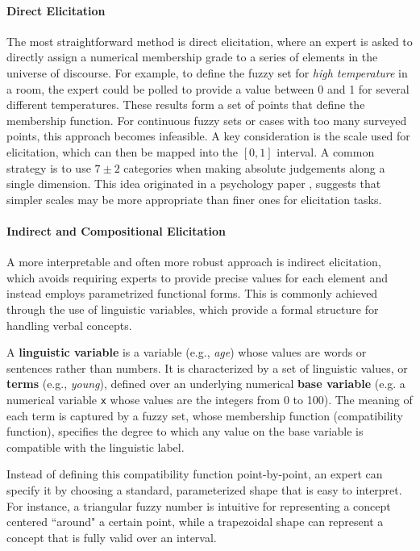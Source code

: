 \paragraph{Direct Elicitation}
The most straightforward method is direct elicitation, where an expert is asked to directly assign a numerical membership grade to a series of elements in the universe of discourse. For example, to define the fuzzy set for \emph{high temperature} in a room, the expert could be polled to provide a value between 0 and 1 for several different temperatures. These results form a set of points that define the membership function. For continuous fuzzy sets or cases with too many surveyed points, this approach becomes infeasible. A key consideration is the scale used for elicitation, which can then be mapped into the $[0,1]$ interval. A common strategy is to use $7\pm2$ categories when making absolute judgements along a single dimension. This idea originated in a psychology paper \cite{miller1956magical}, suggests that simpler scales may be more appropriate than finer ones for elicitation tasks.

\paragraph{Indirect and Compositional Elicitation}
A more interpretable and often more robust approach is indirect elicitation, which avoids requiring experts to provide precise values for each element and instead employs parametrized functional forms. This is commonly achieved through the use of linguistic variables, which provide a formal structure for handling verbal concepts.

\begin{definition}
A \textbf{linguistic variable} is a variable (e.g., \emph{age}) whose values are words or sentences rather than numbers. It is characterized by a set of linguistic values, or \textbf{terms} (e.g., \emph{young}), defined over an underlying numerical \textbf{base variable} (e.g. a numerical variable \texttt{x} whose values are the integers from 0 to 100). The meaning of each term is captured by a fuzzy set, whose membership function (compatibility function), specifies the degree to which any value on the base variable is compatible with the linguistic label.
\end{definition}

Instead of defining this compatibility function point-by-point, an expert can specify it by choosing a standard, parameterized shape that is easy to interpret. For instance, a triangular fuzzy number is intuitive for representing a concept centered ``around" a certain point, while a trapezoidal shape can represent a concept that is fully valid over an interval. 

